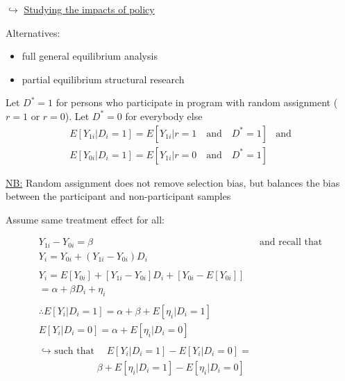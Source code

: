 \noindent $\hookrightarrow$ \underline{Studying the impacts of policy}

Alternatives: 
\begin{itemize}
\item full general equilibrium analysis 
\item partial equilibrium structural research
\end{itemize}

\noindent Let $D^{*}=1$ for persons who participate in program with random assignment ($r=1$ or $r=0$). 
\newline Let $D^{*}=0$ for everybody else
\begin{eqnarray}
E[Y_{1i}|D_{i}=1] = E[Y_{1i}|r=1 \quad\text{and}\quad D^{*}=1] & \text{and} \\
E[Y_{0i}|D_{i}=1] = E[Y_{1i}|r=0 \quad\text{and}\quad  D^{*}=1] &
\end{eqnarray}


\vspace{4 mm}

\noindent \underline{NB:} Random assignment does not remove selection bias, but balances the bias between the participant and non-participant samples

\vspace{4 mm}

\newline \noindent Assume same treatment effect for all:

\begin{eqnarray}
Y_{1i} - Y_{0i} = \beta & \text{and recall that}\\
  Y_{i} = Y_{0i} + (Y_{1i}-Y_{0i})D_{i} \\
& \nonumber \\
Y_{i} = E[Y_{0i}] + [Y_{1i}-Y_{0i}]D_{i} + [Y_{0i}-E[Y_{0i}]] \\
=\alpha+\beta D_{i} + \eta_{i} \quad \qquad \qquad \qquad  \qquad \qquad\\
& \nonumber \\
\therefore E[Y_{i}|D_{i}=1] = \alpha + \beta + E[\eta_{i}|D_{i}=1] \\
 E[Y_{i}|D_{i}=0] = \alpha + E[\eta_{i}|D_{i}=0]\\
 & \nonumber \\
 \text{$\hookrightarrow$ such that} \quad E[Y_{i}|D_{i}=1] - E[Y_{i}|D_{i}=0] = \\
 \qquad \qquad \qquad \beta + E[\eta_{i}|D_{i}=1] - E[\eta_{i}|D_{i}=0] 
\end{eqnarray}

